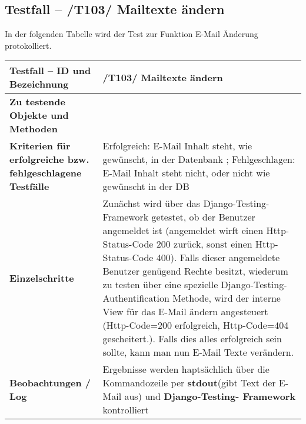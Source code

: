 \subsection{Testfall -- /T103/ Mailtexte ändern}
In der folgenden Tabelle wird der Test zur Funktion E-Mail Änderung protokolliert.
\begin{longtable}{|p{5cm}|p{10cm}|}
\hline
\textbf{Testfall -- ID und Bezeichnung} &  \textnormal{/T103/ Mailtexte ändern} \\
\hline
\textbf{Zu testende Objekte und Methoden} &  \textnormal{
\begin{itemize}
\item In Komponente \textit{Admin} der Bereich E-Mail 
\end{itemize} }
\\
\hline
\textbf{Kriterien f\"ur erfolgreiche bzw. fehlgeschlagene Testf\"alle} &
\textnormal{Erfolgreich: E-Mail Inhalt steht, wie gewünscht, in der Datenbank ;
        Fehlgeschlagen: E-Mail Inhalt steht nicht, oder nicht wie gewünscht in der DB   } \\
\hline
\textbf{Einzelschritte} &  \textnormal{Zunächst wird über das Django-Testing-Framework getestet,
ob der Benutzer angemeldet ist (angemeldet wirft einen Http-Status-Code 200 zurück, sonst 
einen Http-Status-Code 400). Falls dieser angemeldete Benutzer genügend Rechte besitzt,
wiederum zu testen über eine spezielle Django-Testing-Authentification Methode, wird der interne View
für das E-Mail ändern angesteuert (Http-Code=200 erfolgreich, Http-Code=404 gescheitert.).
Falls dies alles erfolgreich sein sollte, kann man nun E-Mail Texte verändern.
} \\
\hline
\textbf{Beobachtungen / Log} &  \textnormal{Ergebnisse werden haptsächlich über 
die Kommandozeile per \textbf{stdout}(gibt Text der E-Mail aus) und \textbf{Django-Testing-
Framework} kontrolliert  } \\
\hline


 \end{longtable}


